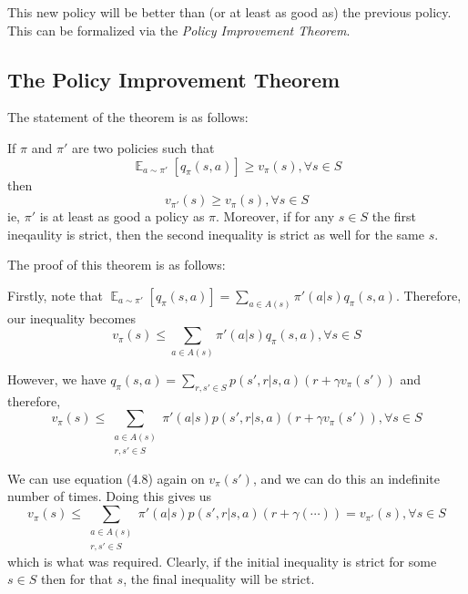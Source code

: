 \documentclass[12pt]{report}
\begin{document}
This new policy will be better than (or at least as good as) the previous policy. This can be formalized via the \textit{Policy Improvement Theorem}.
\subsection{The Policy Improvement Theorem}
\label{subsec:PIT}
The statement of the theorem is as follows:

If $\pi$ and $\pi'$ are two policies such that
\begin{equation}
    \mathop{\mathbb{E}}_{a \sim \pi'}\left[q_{\pi}(s, a)\right] \geq v_{\pi}(s), \forall s \in S
\end{equation}
then
\begin{equation}
    v_{\pi'}(s) \geq v_{\pi}(s), \forall s \in S
\end{equation}
ie, $\pi'$ is at least as good a policy as $\pi$. Moreover, if for any $s \in S$ the first ineqaulity is strict, then the second inequality is strict as well for the same $s$.

The proof of this theorem is as follows:

Firstly, note that $\mathop{\mathbb{E}}_{a \sim \pi'}\left[q_{\pi}(s, a)\right] = \sum\limits_{a \in A(s)} \pi'(a | s) q_{\pi}(s, a)$. Therefore, our inequality becomes
\begin{equation}
    v_{\pi}(s) \leq \sum\limits_{a \in A(s)} \pi'(a | s) q_{\pi}(s, a), \forall s \in S
\end{equation}

However, we have $q_{\pi}(s, a) = \sum\limits_{r, s' \in S} p(s', r | s, a)(r + \gamma v_{\pi}(s'))$ and therefore, 
\begin{equation}
    v_{\pi}(s) \leq \sum\limits_{\substack{a \in A(s)\\r, s' \in S}} \pi'(a | s) p(s', r | s, a)(r + \gamma v_{\pi}(s')), \forall s \in S
\end{equation}

We can use equation (4.8) again on $v_{\pi}(s')$, and we can do this an indefinite number of times. Doing this gives us
\begin{equation}
    v_{\pi}(s) \leq \sum\limits_{\substack{a \in A(s)\\r, s' \in S}} \pi'(a | s) p(s', r | s, a)(r + \gamma(\cdots)) = v_{\pi'}(s), \forall s \in S
\end{equation}
which is what was required. Clearly, if the initial inequality is strict for some $s \in S$ then for that $s$, the final inequality will be strict.
\end{document}
